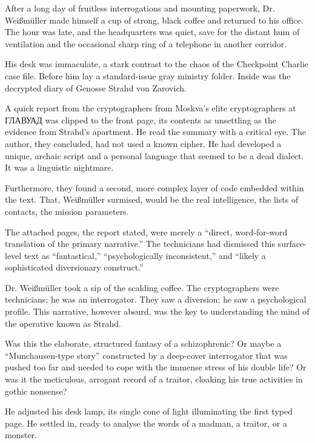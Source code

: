 After a long day of fruitless interrogations and mounting paperwork, Dr. Weißmüller made himself a cup of strong, black coffee and returned to his office.
The hour was late, and the headquarters was quiet, save for the distant hum of ventilation and the occasional sharp ring of a telephone in another corridor.

His desk was immaculate, a stark contrast to the chaos of the Checkpoint Charlie case file.
Before him lay a standard-issue gray ministry folder.
Inside was the decrypted diary of Genosse Strahd von Zarovich.

A quick report from the cryptographers from Moskva's elite cryptographers at ГЛАВУАД was clipped to the front page, its contents as unsettling as the evidence from Strahd's apartment.
He read the summary with a critical eye.
The author, they concluded, had not used a known cipher.
He had developed a unique, archaic script and a personal language that seemed to be a dead dialect.
It was a linguistic nightmare.

Furthermore, they found a second, more complex layer of code embedded within the text.
That, Weißmüller surmised, would be the real intelligence, the lists of contacts, the mission parameters.

The attached pages, the report stated, were merely a ``direct, word-for-word translation of the primary narrative.''
The technicians had dismissed this surface-level text as ``fantastical,'' ``psychologically inconsistent,'' and ``likely a sophisticated diversionary construct.''

Dr. Weißmüller took a sip of the scalding coffee.
The cryptographers were technicians; he was an interrogator.
They saw a diversion; he saw a psychological profile.
This narrative, however absurd, was the key to understanding the mind of the operative known as Strahd.

Was this the elaborate, structured fantasy of a schizophrenic?
Or maybe a ``Munchausen-type story'' constructed by a deep-cover interrogator that was pushed too far and needed to cope with the immense stress of his double life?
Or was it the meticulous, arrogant record of a traitor, cloaking his true activities in gothic nonsense?

He adjusted his desk lamp, its single cone of light illuminating the first typed page.
He settled in, ready to analyse the words of a madman, a traitor, or a monster.

\vfill\newpage
